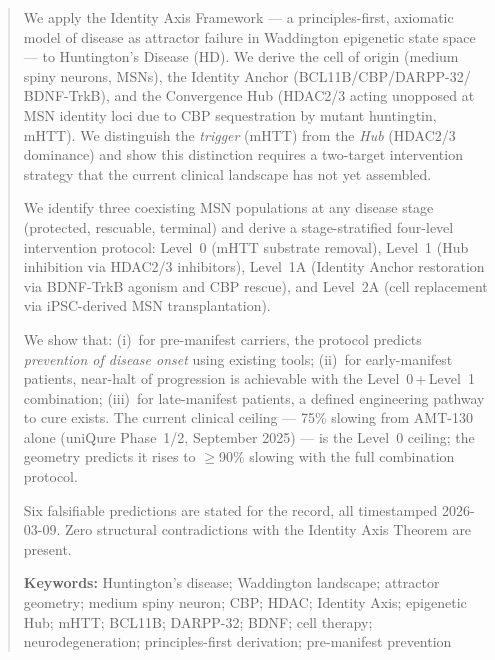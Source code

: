 \documentclass[12pt,a4paper]{article}
\begin{document}
\vspace{1em}

\begin{abstract}
\noindent
We apply the Identity Axis Framework --- a principles-first,
axiomatic model of disease as attractor failure in Waddington
epigenetic state space --- to Huntington's Disease (HD).
We derive the cell of origin (medium spiny neurons, MSNs),
the Identity Anchor (BCL11B\slash CBP\slash DARPP-32\slash
BDNF-TrkB), and the Convergence Hub (HDAC2/3 acting unopposed
at MSN identity loci due to CBP sequestration by mutant
huntingtin, mHTT). We distinguish the \emph{trigger} (mHTT)
from the \emph{Hub} (HDAC2/3 dominance) and show this
distinction requires a two-target intervention strategy that
the current clinical landscape has not yet assembled.

We identify three coexisting MSN populations at any disease
stage (protected, rescuable, terminal) and derive a
stage-stratified four-level intervention protocol: Level~0
(mHTT substrate removal), Level~1 (Hub inhibition via
HDAC2/3 inhibitors), Level~1A (Identity Anchor restoration
via BDNF-TrkB agonism and CBP rescue), and Level~2A (cell
replacement via iPSC-derived MSN transplantation).

We show that: (i)~for pre-manifest carriers, the protocol
predicts \emph{prevention of disease onset} using existing
tools; (ii)~for early-manifest patients, near-halt of
progression is achievable with the Level~0\,+\,Level~1
combination; (iii)~for late-manifest patients, a defined
engineering pathway to cure exists. The current clinical
ceiling --- 75\% slowing from AMT-130 alone (uniQure
Phase~1/2, September 2025) --- is the Level~0 ceiling; the
geometry predicts it rises to $\geq$90\% slowing with the
full combination protocol.

Six falsifiable predictions are stated for the record, all
timestamped 2026-03-09. Zero structural contradictions with
the Identity Axis Theorem are present.

\medskip\noindent\textbf{Keywords:}
Huntington's disease; Waddington landscape; attractor
geometry; medium spiny neuron; CBP; HDAC; Identity Axis;
epigenetic Hub; mHTT; BCL11B; DARPP-32; BDNF; cell therapy;
neurodegeneration; principles-first derivation; pre-manifest
prevention
\end{abstract}

\newpage
\tableofcontents
\newpage

\end{document}

